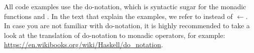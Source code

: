 All code examples use the do-notation, which is syntactic sugar for the monadic functions \code{>>=} and 
\code{>>}. In the text that explain the examples, we refer to \code{>>=} instead of $\leftarrow$.
In case you are not familiar with do-notation, it is highly recommended to take a look at the translation
of do-notation to monadic operators, for example: \url{https://en.wikibooks.org/wiki/Haskell/do_notation}.
